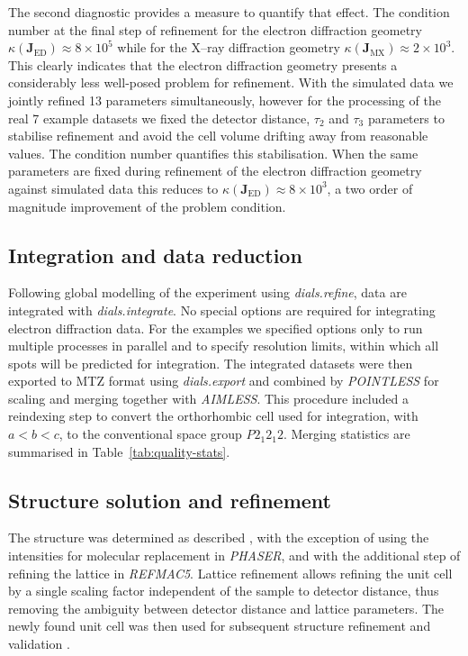 \documentclass[preprint]{iucr}
\newcommand{\dialsrefine}{\emph{dials.refine}\xspace}
\newcommand{\dialsintegrate}{\emph{dials.integrate}\xspace}
\newcommand{\dialsexport}{\emph{dials.export}\xspace}
\newcommand{\pointless}{\emph{POINTLESS}\xspace}
\newcommand{\aimless}{\emph{AIMLESS}\xspace}
\newcommand{\refmac}{\emph{REFMAC5}\xspace}
\newcommand{\phaser}{\emph{PHASER}\xspace}
\newcommand{\mat}[1]{\mathbf{#1}}
\begin{document}
The second diagnostic provides a measure to quantify that effect. The condition
number at the final step of refinement for the electron diffraction geometry
$\kappa \left( \mat{J}_{\textrm{ED}} \right) \approx 8 \times 10^5$ while for
the X--ray diffraction geometry $\kappa \left( \mat{J}_{\textrm{MX}} \right)
\approx 2 \times 10^3$. This clearly indicates that the electron diffraction
geometry presents a considerably less well-posed problem for refinement. With
the simulated data we jointly refined 13 parameters simultaneously, however for
the processing of the real 7 example datasets we fixed the detector distance,
$\tau_2$ and $\tau_3$ parameters to stabilise refinement and avoid the cell
volume drifting away from reasonable values. The condition number quantifies
this stabilisation. When the same parameters are fixed during refinement of the
electron diffraction geometry against simulated data this reduces to $\kappa
\left( \mat{J}_{\textrm{ED}} \right) \approx 8 \times 10^3$, a two order of
magnitude improvement of the problem condition.

\subsection{Integration and data reduction}

Following global modelling of the experiment using \dialsrefine, data are
integrated with \dialsintegrate. No special options are required for integrating
electron diffraction data. For the examples we specified options only to
run multiple processes in parallel and to specify resolution limits, within
which all spots will be predicted for integration.
The integrated datasets were then exported to MTZ format using
\dialsexport and combined by \pointless \cite{Evans2006} for scaling and merging
together with \aimless \cite{Evans2013}. This procedure included a reindexing
step to convert the orthorhombic cell used for integration, with $a<b<c$, to the
conventional space group $P 2_1 2_1 2$. Merging statistics are summarised in
Table~\ref{tab:quality-stats}.

\subsection{Structure solution and refinement \label{sec:phase-refine}}

The structure was determined as described \cite{Clabbers2017}, with the exception of
using the intensities for molecular replacement in \phaser \cite{McCoy2007,Read2016},
and with the additional step of refining the lattice in \refmac \cite{Murshudov2011}.
Lattice refinement allows refining the unit cell by a single scaling factor independent
of the sample to detector distance, thus removing the ambiguity between detector
distance and lattice parameters. The newly found unit cell was then used for subsequent
structure refinement and validation \cite{Murshudov2011,Joosten2014,Luebben2015}.
\end{document}
